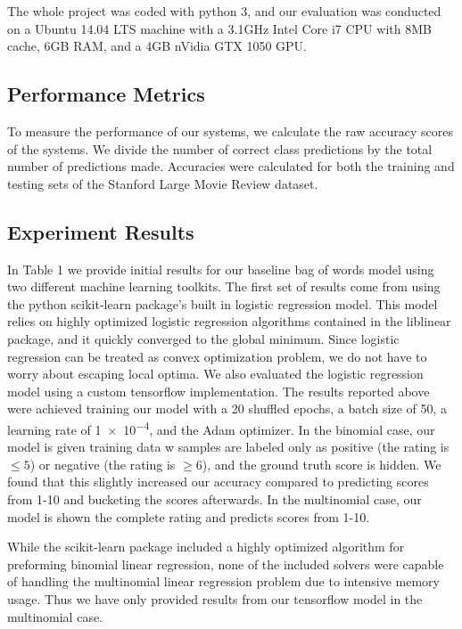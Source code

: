 \documentclass[conference]{IEEEtran}
\begin{document}
    The whole project was coded with python 3, and our evaluation was conducted on
    a Ubuntu 14.04 LTS machine with a 3.1GHz Intel Core i7 CPU with 8MB cache,
    6GB RAM, and a 4GB nVidia GTX 1050 GPU.
    
\subsection{Performance Metrics}
    To measure the performance of our systems, we calculate the raw accuracy
    scores of the systems. We divide the number of correct class predictions
    by the total number of predictions made. Accuracies were calculated
    for both the training and testing sets of the Stanford Large Movie Review dataset.
    
\subsection{Experiment Results}
    In Table 1 we provide initial results for our baseline bag of words model using
    two different machine learning toolkits. The first set of results come from
    using the python scikit-learn package's built in logistic regression model.
    This model relies on highly optimized logistic regression algorithms
    contained in the liblinear \cite{Fan:2008:LLL:1390681.1442794} package,
    and it quickly converged to the global minimum. Since logistic regression
    can be treated as convex optimization problem, we do not have to worry 
    about escaping local optima. We also evaluated the logistic regression
    model using a custom tensorflow implementation. The results reported
    above were achieved training our model with a 20 shuffled epochs, a
    batch size of 50, a learning rate of \num{1e-4}, and the Adam optimizer.
    In the binomial case, our model is given training data w samples are
    labeled only as positive (the rating is $\leq 5$) or negative (the rating is
    $\geq 6$), and the ground truth score is hidden. We found that this slightly
    increased our accuracy compared to predicting scores from 1-10 and
    bucketing the scores afterwards. In the multinomial case, our model is
    shown the complete rating and predicts scores from 1-10.
    
    While the scikit-learn package included a highly optimized algorithm for
    preforming binomial linear regression, none of the included solvers were
    capable of handling the multinomial linear regression problem due to intensive
    memory usage. Thus we have only provided results from our tensorflow
    model in the multinomial case.
\end{document}
